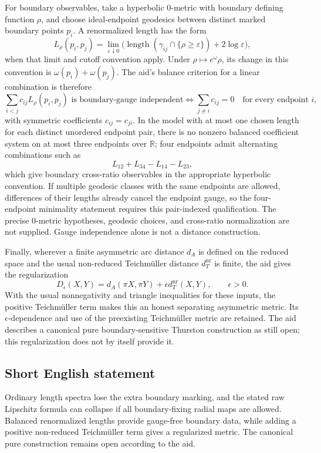 \documentclass[11pt]{article}
\newcommand{\R}{\mathbb{R}}
\begin{document}
For boundary observables, take a hyperbolic \(0\)-metric with boundary defining function \(\rho\), and choose ideal-endpoint geodesics between distinct marked boundary points \(p_i\). A renormalized length has the form
\[
 L_\rho(p_i,p_j)=\lim_{\varepsilon\downarrow0}
 \bigl(\operatorname{length}(\gamma_{ij}\cap\{\rho\geq\varepsilon\})+2\log\varepsilon\bigr),
\]
when that limit and cutoff convention apply. Under \(\rho\mapsto e^\omega\rho\), its change in this convention is \(\omega(p_i)+\omega(p_j)\). The aid's balance criterion for a linear combination is therefore
\[
 \sum_{i<j}c_{ij}L_\rho(p_i,p_j)\text{ is boundary-gauge independent}
 \Longleftrightarrow
 \sum_{j\ne i}c_{ij}=0\quad\text{for every endpoint }i,
\]
with symmetric coefficients \(c_{ij}=c_{ji}\). In the model with at most one chosen length for each distinct unordered endpoint pair, there is no nonzero balanced coefficient system on at most three endpoints over \(\R\); four endpoints admit alternating combinations such as
\[
 L_{12}+L_{34}-L_{14}-L_{23},
\]
which give boundary cross-ratio observables in the appropriate hyperbolic convention. If multiple geodesic classes with the same endpoints are allowed, differences of their lengths already cancel the endpoint gauge, so the four-endpoint minimality statement requires this pair-indexed qualification. The precise \(0\)-metric hypotheses, geodesic choices, and cross-ratio normalization are not supplied. Gauge independence alone is not a distance construction.

Finally, wherever a finite asymmetric arc distance \(d_A\) is defined on the reduced space and the usual non-reduced Teichm\"uller distance \(d_T^{\mathrm{nr}}\) is finite, the aid gives the regularization
\[
 D_\epsilon(X,Y)=d_A(\pi X,\pi Y)+\epsilon d_T^{\mathrm{nr}}(X,Y),\qquad\epsilon>0.
\]
With the usual nonnegativity and triangle inequalities for these inputs, the positive Teichm\"uller term makes this an honest separating asymmetric metric. Its \(\epsilon\)-dependence and use of the preexisting Teichm\"uller metric are retained. The aid describes a canonical pure boundary-sensitive Thurston construction as still open; this regularization does not by itself provide it.
\subsection{Short English statement}
Ordinary length spectra lose the extra boundary marking, and the stated raw Lipschitz formula can collapse if all boundary-fixing radial maps are allowed. Balanced renormalized lengths provide gauge-free boundary data, while adding a positive non-reduced Teichm\"uller term gives a regularized metric. The canonical pure construction remains open according to the aid.
\end{document}
